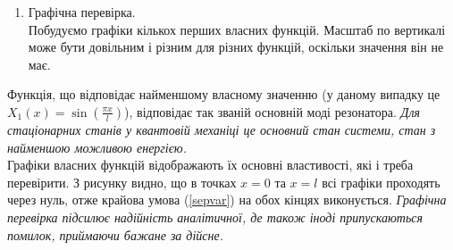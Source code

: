 \documentclass[a4paper, 14pt]{extreport}
\begin{document}
\begin{enumerate}
\begin{enumerate}
    \end{enumerate}
    \item Графічна перевірка.\\
    Побудуємо графіки кількох перших власних функцій. Масштаб по вертикалі може бути довільним і різним для різних функцій, оскільки значення він не має.
    \begin{center}
    \end{center}
\end{enumerate}
Функція, що відповідає найменшому власному значенню (у даному випадку це $X_1(x) = \sin\left(\frac{\pi x}{l}\right)$), відповідає так званій основній моді резонатора. \textit{Для стаціонарних станів у квантовій механіці це основний стан системи, стан з найменшою можливою енергією.}\\
Графіки власних функцій відображають їх основні властивості, які і треба перевірити. З рисунку видно, що в точках $x = 0$ та $x = l$ всі графіки проходять через нуль, отже крайова умова (\ref{sepvar}) на обох кінцях виконується. \textit{Графічна перевірка підсилює надійність аналітичної, де також іноді припускаються помилок, приймаючи бажане за дійсне.}
\end{document}
